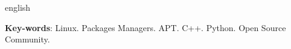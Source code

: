 \begin{resumo}[Abstract]
 \begin{otherlanguage*}{english}

   \vspace{\onelineskip}
 
   \noindent 
   \textbf{Key-words}: Linux. Packages Managers. APT. C++. Python. Open Source Community.
 \end{otherlanguage*}
\end{resumo}
